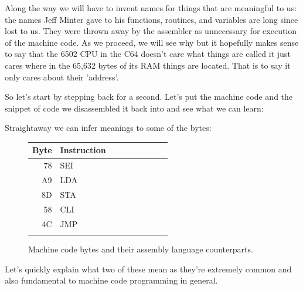 Along the way we will have to invent names for things that are meaningful to us: the names Jeff Minter gave to his
functions, routines, and variables are long since lost to us. They were thrown away by the assembler as unnecessary
for execution of the machine code. As we proceed, we will see why but it hopefully makes sense to say that the
6502 CPU in the C64 doesn't care what things are called it just cares where in the 65,632 bytes of its RAM things
are located. That is to say it only cares about their 'address'.

So let's start by stepping back for a second. Let's put the machine code and the snippet of code we disassembled it
back into and see what we can learn:

\begin{minipage}[b]{0.45\linewidth}
\centering

\end{minipage}
\hspace{0.5cm}
\begin{minipage}[b]{0.45\linewidth}
\centering

\end{minipage}


Straightaway we can infer meanings to some of the bytes:

\begin{figure}[H]
  {
    \setlength{\tabcolsep}{3.0pt}
    \setlength\cmidrulewidth{\heavyrulewidth} %
    \begin{adjustbox}{width=3cm,center}

      \begin{tabular}{rllllllll}
        \toprule
        Byte & Instruction &\\
        \midrule
78 & SEI & \\
A9 & LDA & \\
8D & STA & \\
58 & CLI & \\
4C & JMP & \\
        \addlinespace
        \bottomrule
      \end{tabular}
    \end{adjustbox}
  }\caption{Machine code bytes and their assembly language counterparts.}
\end{figure}

Let's quickly explain what two of these mean as they're extremely common and also fundamental to
machine code programming in general.

